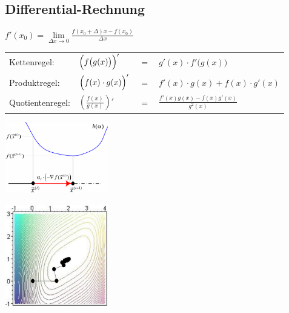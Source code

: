   \begin{minipage}[t]{10cm}
  	  \subsection{Differential-Rechnung}
  	  $f'(x_0)=\lim\limits_{\Delta x\rightarrow 0}
  	  \frac{f(x_0+\Delta)x-f(x_0)}{\Delta x}$\\
  	  	\begin{tabular}{llll}
  	  		Kettenregel:	& $\Bigl(f\big(g(x)\big)\Bigr)'$ &$=$ & $g'(x)\cdot f'\big(g(x)\big)$\\[0.1cm]
  	  		Produktregel:	& $\Bigl(f(x)\cdot g(x)\Bigr)'$ &$=$ & $f'(x)\cdot g(x) + f(x)\cdot g'(x)$\\[0.1cm]
  	  		Quotientenregel:& $\left(\frac{f(x)}{g(x)}\right)'$ &$=$ & $\frac{f'(x)g(x)-f(x)g'(x)}{g^2(x)}$\\
  	  	\end{tabular}
	  \begin{minipage}{4.5cm}
	    \includegraphics[width=4.5cm]{./Content/NonLinearOptimization/Gradient1D.png}
	  \end{minipage}
	  \hfill
	  \begin{minipage}{4.5cm}
	  	\includegraphics[width=4.5cm]{./Content/NonLinearOptimization/gradient-descent}
	  \end{minipage}
 \end{minipage}
 
 
 
